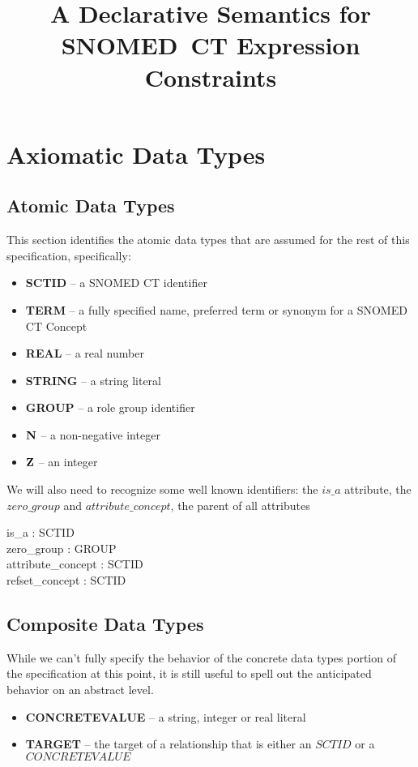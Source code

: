 \documentclass{article}
\title{A Declarative Semantics for SNOMED~CT Expression Constraints}
\begin{document}
\maketitle
\tableofcontents

\section{Axiomatic Data Types}
\subsection{Atomic Data Types}
This section identifies the atomic data types that are assumed for the rest of this specification, specifically:
\begin{itemize}[noitemsep]
\item \textbf{SCTID} -- a SNOMED CT identifier
\item \textbf{TERM} --  a  fully specified name, preferred term or synonym for a SNOMED CT Concept
\item \textbf{REAL} --  a real number
\item \textbf{STRING} -- a string literal
\item \textbf{GROUP} -- a role group identifier
\item \textbf{${\mathbf{N}}$} -- a non-negative integer
\item \textbf{${\mathbf{Z}}$} -- an integer
\end{itemize}

\begin{zed}
\end{zed}


We will also need to recognize some well known identifiers: the $is\_a$ attribute, the $zero\_group$ and  $attribute\_concept$, the parent of all attributes
\begin{axdef}
is\_a : SCTID \\
zero\_group : GROUP \\
attribute\_concept : SCTID \\
refset\_concept : SCTID
\end{axdef}

\subsection{Composite Data Types}
While we can't fully specify the behavior of the concrete data types portion of the specification at this point, it is still useful 
to spell out the anticipated behavior on an abstract level.
\begin{itemize}[noitemsep,nolistsep]
\item \textbf{CONCRETEVALUE} -- a string, integer or real literal
\item \textbf{TARGET} -- the target of a relationship that is either an $SCTID$ or a $CONCRETEVALUE$
\end{itemize}
\end{document}
